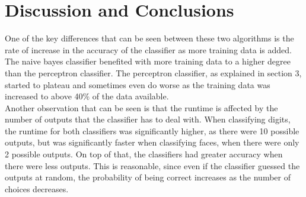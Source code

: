 \documentclass[12pt, letterpaper]{article}
\begin{document}
\section{Discussion and Conclusions}
One of the key differences that can be seen between these two algorithms is the rate of increase in the accuracy of the classifier as more training data is added. The naive bayes classifier benefited with more training data to a higher degree than the perceptron classifier. The perceptron classifier, as explained in section 3, started to plateau and sometimes even do worse as the training data was increased to above 40\% of the data available. \\ 
Another observation that can be seen is that the runtime is affected by the number of outputs that the classifier has to deal with. When classifying digits, the runtime for both classifiers was significantly higher, as there were 10 possible outputs, but was significantly faster when classifying faces, when there were only 2 possible outputs. On top of that, the classifiers had greater accuracy when there were less outputs. This is reasonable, since even if the classifier guessed the outputs at random, the probability of being correct increases as the number of choices decreases.\\ 
\end{document}
